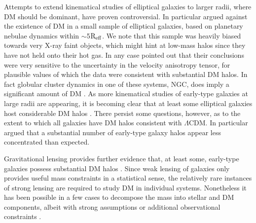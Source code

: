 \documentclass{emulateapj}
\def \eg {e.g.}
\newcommand{\reff}{${\rm R_{eff}}$}
\newcommand{\lcdm}{$\Lambda$CDM}
\newcommand{\thin}{\thinspace}
\begin{document}
Attempts to extend kinematical studies of elliptical galaxies
to larger radii, where DM should be dominant, 
have proven controversial. 
In particular \citet{romanowsky03a} argued against the existence
of DM in a small sample of elliptical galaxies, based on 
planetary nebulae dynamics within $\sim$5\reff. 
We note that this sample was heavily biased towards very X-ray
faint objects, which might hint at low-mass halos
since they have not held onto their hot gas. 
In any case \citet{dekel05a} pointed out that their
conclusions were very sensitive
to the uncertainty in the velocity anisotropy tensor,
for plausible values of which the data were consistent
with substantial DM halos.
In fact globular cluster dynamics in one of these systems,
NGC\thin 3379, does imply a significant amount of DM 
\citep{pierce06a,bergond06a}.
As more kinematical studies of early-type galaxies at
large radii are appearing, it is becoming clear
that at least some elliptical galaxies host considerable
DM halos \citep[\eg][]{statler99a,romanowsky05a}. There
persist some questions, however, as to the extent 
to which all galaxies have DM halos consistent with \lcdm.
In particular \citet{napolitano05a} argued
that a substantial number of early-type galaxy halos
appear  less concentrated than expected.

Gravitational lensing provides further evidence
that, at least some, early-type galaxies possess substantial
DM halos \citep[\eg][]{kochanek95a,fischer00a,rusin02a}. 
Since weak lensing of galaxies only provides useful mass constraints
in a statistical sense, the relatively rare instances of 
strong lensing are required to study DM in individual systems.
Nonetheless it has been possible in a few cases to decompose 
the mass into stellar and DM components, albeit with strong 
assumptions or additional observational constraints
\citep[\eg][]{rusin03a,treu04a}.
\end{document}
